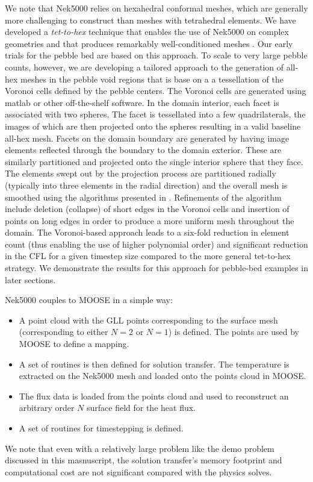 We note that Nek5000 relies on hexahedral conformal meshes, which are generally
more challenging to construct than meshes with tetrahedral elements.  We have
developed a \textit{tet-to-hex} technique that enables the use of Nek5000 on 
complex geometries and that produces remarkably well-conditioned meshes
\cite{yuan2020spectral}.  Our early trials for the pebble bed are based on this
approach.  To scale to very large pebble counts, however, we are developing a
tailored approach to the generation of all-hex meshes in the pebble void regions
that is base on a a tessellation of the Voronoi cells defined by the pebble
centers.  The Voronoi cells are generated using matlab or other off-the-shelf
software.  In the domain interior, each facet is associated with two spheres.
The facet is tessellated into a few quadrilaterals, the images of which are
then projected onto the spheres resulting in a valid baseline all-hex mesh.
Facets on the domain boundary are generated by having image elements reflected
through the boundary to the domain exterior.  These are similarly partitioned
and projected onto the single interior sphere that they face.  The elements
swept out by the projection process are partitioned radially (typically into
three elements in the radial direction) and the overall mesh is smoothed using
the algorithms presented in \cite{mittal19a}.  Refinements of the algorithm
include deletion (collapse) of short edges in the Voronoi cells and insertion
of points on long edges in order to produce a more uniform mesh throughout the
domain.  The Voronoi-based approach leads to a six-fold reduction in element 
count (thus enabling the use of higher polynomial order) and significant 
reduction in the CFL for a given timestep size compared to the more general
tet-to-hex strategy.  We demonstrate the results for this approach for
pebble-bed examples in later sections.

Nek5000 couples to MOOSE in a simple way:
\begin{itemize}
 \item A point cloud with the GLL points corresponding to the surface mesh
      (corresponding to either $N = 2$ or $N = 1$) is defined. The points are 
      used by MOOSE to define a mapping.  
 \item A set of routines is then defined for solution transfer. The temperature 
      is extracted on the Nek5000 mesh and loaded onto the points cloud in MOOSE.
 \item The flux data is loaded from the points cloud and used to reconstruct 
      an arbitrary order $N$ surface field for the heat flux.  
 \item A set of routines for timestepping is defined.  
\end{itemize} 
We note that even with a relatively large problem like the demo problem
discussed in this masnuscript, the solution transfer's memory footprint and
computational cost are not significant compared with the physics solves.


